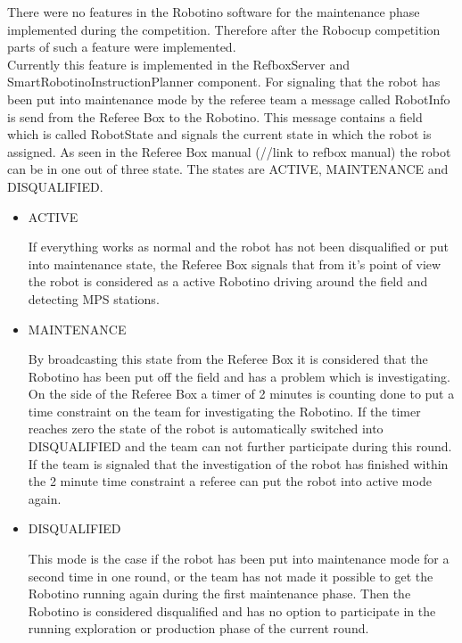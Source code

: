 There were no features in the Robotino software for the maintenance phase implemented during the competition. Therefore after the Robocup competition parts of such a feature were implemented. \\

Currently this feature is implemented in the RefboxServer and SmartRobotinoInstructionPlanner component. For signaling that the robot has been put into maintenance mode by the referee team a message called RobotInfo is send from the Referee Box to the Robotino. This message contains a field which is called RobotState and signals the current state in which the robot is assigned. As seen in the Referee Box manual (//link to refbox manual) the robot can be in one out of three state. The states are ACTIVE, MAINTENANCE and DISQUALIFIED. \\

\begin{itemize}

\item ACTIVE

If everything works as normal and the robot has not been disqualified or put into maintenance state, the Referee Box signals that from it's point of view the robot is considered as a active Robotino driving around the field and detecting MPS stations. 


\item MAINTENANCE

By broadcasting this state from the Referee Box it is considered that the Robotino has been put off the field and has a problem which is investigating. On the side of the Referee Box a timer of 2 minutes is counting done to put a time constraint on the team for investigating the Robotino. If the timer reaches zero the state of the robot is automatically switched into DISQUALIFIED and the team can not further participate during this round. If the team is signaled that the investigation of the robot has finished within the 2 minute time constraint a referee can put the robot into active mode again. 

\item DISQUALIFIED

This mode is the case if the robot has been put into maintenance mode for a second time in one round, or the team has not made it possible to get the Robotino running again during the first maintenance phase. Then the Robotino is considered disqualified and has no option to participate in the running exploration or production phase of the current round.  

\end{itemize}

